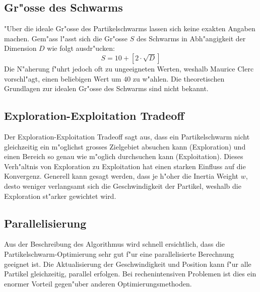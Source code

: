 \subsection{Gr"osse des Schwarms}
"Uber die ideale Gr"osse des Partikelschwarms lassen sich keine exakten
Angaben machen. Gem"ass \cite{Clerc-Standards} l"asst sich die Gr"osse
$S$ des Schwarms in Abh"angigkeit der Dimension $D$ wie folgt ausdr"ucken:
\begin{equation}
	S = 10 + \left[ 2 \cdot \sqrt{D} \right]
\end{equation}
Die N"aherung f"uhrt jedoch oft zu ungeeigneten Werten, weshalb Maurice
Clerc vorschl"agt, einen beliebigen Wert um $40$ zu w"ahlen. Die
theoretischen Grundlagen zur idealen Gr"osse des Schwarms sind nicht
bekannt.


\subsection{Exploration-Exploitation Tradeoff}
Der Exploration-Exploitation Tradeoff sagt aus, dass ein Partikelschwarm
nicht gleichzeitig ein m"oglichst grosses Zielgebiet absuchen kann
(Exploration) und einen Bereich so genau wie m"oglich durchsuchen kann
(Exploitation). Dieses Verh"altnis von Exploration zu Exploitation hat
einen starken Einfluss auf die Konvergenz. Generell kann gesagt werden,
dass je h"oher die Inertia Weight $w$, desto weniger verlangsamt sich
die Geschwindigkeit der Partikel, weshalb die Exploration st"arker
gewichtet wird.

\subsection{Parallelisierung}
Aus der Beschreibung des Algorithmus wird schnell ersichtlich, dass
die Partikel\-schwarm-Optimierung sehr gut f"ur eine parallelisierte
Berechnung geeignet ist. Die Aktualisierung der Geschwindigkeit und
Position kann f"ur alle Partikel gleichzeitig, parallel erfolgen. Bei
rechenintensiven Problemen ist dies ein enormer Vorteil gegen"uber
anderen Optimierungsmethoden.




